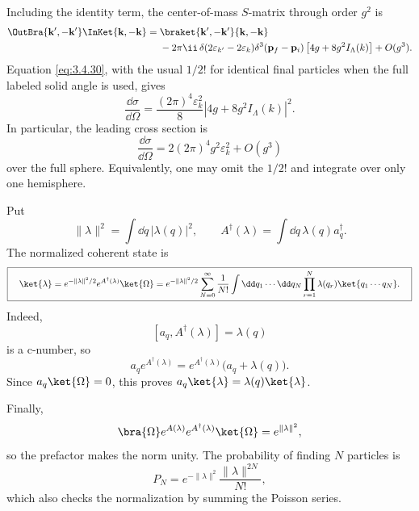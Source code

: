 \begin{enumerate}
Including the identity term, the center-of-mass \(S\)-matrix through
order \(g^2\) is
\[
 \begin{split}
 \OutBra{\mathbf k',-\mathbf k'}\InKet{\mathbf k,-\mathbf k}
 ={}&\braket{\mathbf k',-\mathbf k'}{\mathbf k,-\mathbf k}\\
 &-2\pi \ii\,\delta(2\varepsilon_{k'}-2\varepsilon_k)
 \delta^3(\mathbf p_f-\mathbf p_i)\,
 \bigl[4g+8g^2I_\Lambda(k)\bigr]+O(g^3).
 \end{split}
\]
Equation \eqref{eq:3.4.30}, with the usual \(1/2!\) for identical final
particles when the full labeled solid angle is used, gives
\[
 \frac{\dd\sigma}{\dd\Omega}
 =\frac{(2\pi)^4\varepsilon_k^2}{8}
 \left|4g+8g^2I_\Lambda(k)\right|^2.
\]
In particular, the leading cross section is
\[
 \boxed{\quad
 \frac{\dd\sigma}{\dd\Omega}
 =2(2\pi)^4g^2\varepsilon_k^2+O(g^3)
 \quad}
\]
over the full sphere.  Equivalently, one may omit the \(1/2!\) and
integrate over only one hemisphere.

Put
\[
 \|\lambda\|^2=\int \dd q\,|\lambda(q)|^2,
\qquad
 A^\dagger(\lambda)=\int \dd q\,\lambda(q)a_q^\dagger.
\]
The normalized coherent state is
\[
 \boxed{\quad
 \ket{\lambda}
 =e^{-\|\lambda\|^2/2}e^{A^\dagger(\lambda)}\ket{\Omega}
 =e^{-\|\lambda\|^2/2}
 \sum_{N=0}^{\infty}\frac1{N!}
 \int \dd q_1\cdots \dd q_N
 \prod_{r=1}^N\lambda(q_r)\ket{q_1\cdots q_N}.
 \quad}
\]
Indeed,
\[
 [a_q,A^\dagger(\lambda)]=\lambda(q)
\]
is a c-number, so
\[
 a_qe^{A^\dagger(\lambda)}
 =e^{A^\dagger(\lambda)}\bigl(a_q+\lambda(q)\bigr).
\]
Since \(a_q\ket{\Omega}=0\), this proves
\(a_q\ket{\lambda}=\lambda(q)\ket{\lambda}\).

Finally,
\[
 \bra{\Omega}e^{A(\lambda)}e^{A^\dagger(\lambda)}
 \ket{\Omega}=e^{\|\lambda\|^2},
\]
so the prefactor makes the norm unity.  The probability of finding
\(N\) particles is
\[
 P_N=e^{-\|\lambda\|^2}\frac{\|\lambda\|^{2N}}{N!},
\]
which also checks the normalization by summing the Poisson series.
\end{enumerate}
